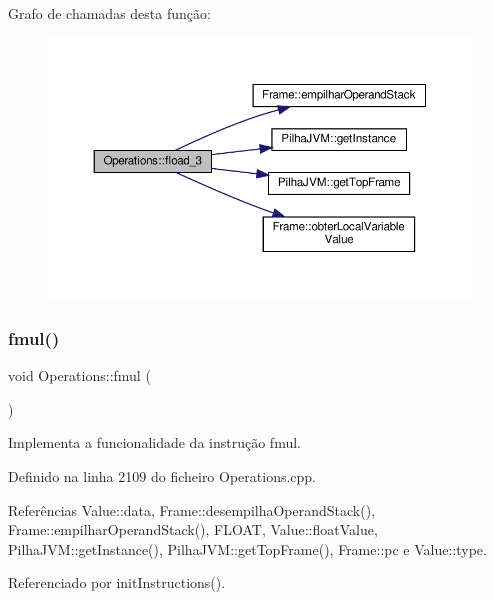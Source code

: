 Grafo de chamadas desta função\+:
\nopagebreak
\begin{figure}[H]
\begin{center}
\leavevmode
\includegraphics[width=350pt]{classOperations_a1d7d4685fea35e0619ff468ed57a4f94_cgraph}
\end{center}
\end{figure}
\mbox{\label{classOperations_ad4caf68c912edd7bfac5c8d74c1e2036}} 
\subsubsection{\texorpdfstring{fmul()}{fmul()}}
{\footnotesize\ttfamily void Operations\+::fmul (\begin{DoxyParamCaption}{ }\end{DoxyParamCaption})\hspace{0.3cm}{\ttfamily [private]}}



Implementa a funcionalidade da instrução fmul. 



Definido na linha 2109 do ficheiro Operations.\+cpp.



Referências Value\+::data, Frame\+::desempilha\+Operand\+Stack(), Frame\+::empilhar\+Operand\+Stack(), F\+L\+O\+AT, Value\+::float\+Value, Pilha\+J\+V\+M\+::get\+Instance(), Pilha\+J\+V\+M\+::get\+Top\+Frame(), Frame\+::pc e Value\+::type.



Referenciado por init\+Instructions().


